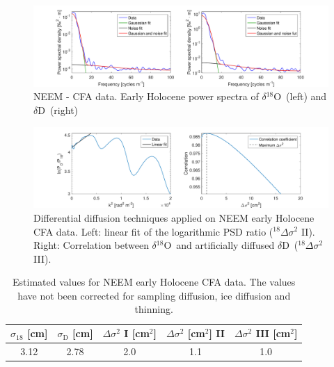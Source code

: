\documentclass[11pt, draftcls, onecolumn]{IEEEtran} %
\numberwithin{equation}{section}
\numberwithin{table}{section}
\numberwithin{figure}{section}
\newcommand{\delOx}{$\delta{}^{18}\mathrm{O}$}
\newcommand{\delD}{$\delta\mathrm{D}$}
\begin{document}
\begin{appendices}
\begin{figure}[H]
	\vspace*{2mm}
	\begin{center}
		\includegraphics[width=1\textwidth]{Figure_22}
		\caption{NEEM - CFA data. Early Holocene power spectra of \delOx~(left) and \delD~(right)}  \label{fig:NEEM_cfa_fig_1}
	\end{center}
\end{figure}

\begin{figure}[H]
	\vspace*{2mm}
	\begin{center}
		\includegraphics[width=1\textwidth]{Figure_23}
		\caption{Differential diffusion techniques applied on NEEM early Holocene CFA data. 
			Left: linear fit of the logarithmic PSD ratio ($^{18}\Delta\sigma^2$ II). Right: 
			Correlation between \delOx~and artificially diffused \delD~($^{18}\Delta\sigma^2$ III).}  \label{fig:NEEM_cfa_fig_2}
	\end{center}
\end{figure}

\begin{table}[H]
	\center
	\caption{Estimated values for NEEM early Holocene CFA data.
	The values have not been corrected for sampling diffusion, ice diffusion and thinning.}
	\label{NEEM_cfa_tbl}
	\begin{tabular}{c c c c c} 
		\toprule
		$\sigma_{18}$ [cm] & $\sigma_\mathrm{D}$ [cm] & $\Delta\sigma^2$ I [cm$^2$] & $\Delta\sigma^2$ [cm$^2$] II & $\Delta\sigma^2$ III [cm$^2$] \\
		\midrule
	  3.12 &   2.78 &     2.0 &     1.1 &     1.0 \\

		\bottomrule		
	\end{tabular}
\end{table}
\clearpage

\end{appendices}
\end{document}
